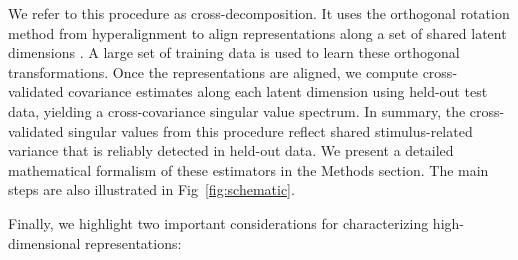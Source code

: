 \documentclass[10pt]{article}
\begin{document}
We refer to this procedure as cross-decomposition. It uses the orthogonal rotation method from hyperalignment to align representations along a set of shared latent dimensions \autocite{Haxby2011}. A large set of training data is used to learn these orthogonal transformations. Once the representations are aligned, we compute cross-validated covariance estimates along each latent dimension using held-out test data, yielding a cross-covariance singular value spectrum. In summary, the cross-validated singular values from this procedure reflect shared stimulus-related variance that is reliably detected in held-out data. We present a detailed mathematical formalism of these estimators in the Methods section. The main steps are also illustrated in Fig~\ref{fig:schematic}.

Finally, we highlight two important considerations for characterizing high-dimensional representations:
\end{document}
